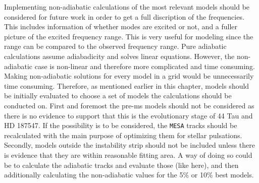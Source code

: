 Implementing non-adiabatic calculations of the most relevant models should be considered for future work in order to get a full discription of the frequencies. This includes information of whether modes are excited or not, and a fuller picture of the excited frequency range. This is very useful for modeling since the range can be compared to the observed frequency range. Pure adiabatic calculations assume adiabadicity and solves linear equations. However, the non-adiabatic case is non-linear and therefore more complicated and time consuming. Making non-adiabatic solutions for every model in a grid would be unnecessarily  time consuming. Therefore, as mentioned earlier in this chapter, models should be initially evaluated to choose a set of models the calculations should be conducted on. First and foremost the pre-ms models should not be considered as there is no evidence to support that this is the evolutionary stage of 44 Tau and HD 187547. If the possibility is to be considered, the \texttt{MESA} tracks should be recalculated with the main purpose of optimizing them for stellar pulsations.  Secondly, models outside the instability strip should not be included unless there is evidence that they are within reasonable fitting area. A way of doing so could be to calculate the adiabatic tracks and evaluate those (like here), and then additionally calculating the non-adiabatic values for the 5\% or 10\% best models. 

